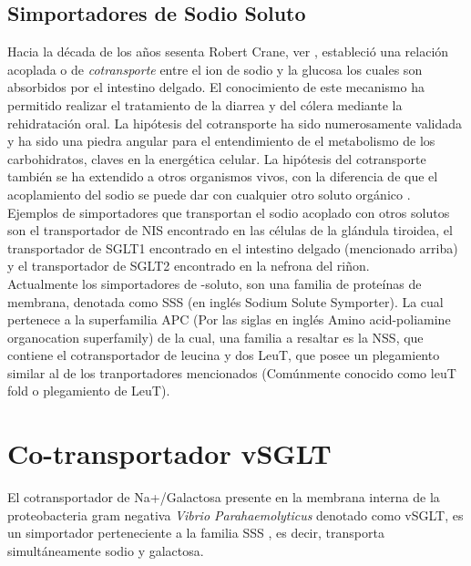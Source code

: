 \subsection{Simportadores de Sodio Soluto}
Hacia la d\'{e}cada de los a\~{n}os sesenta Robert Crane, ver \cite{Hamilton2013}, estableci\'{o} una relaci\'{o}n acoplada o de \textit{cotransporte} entre el ion de sodio y la glucosa los cuales son absorbidos por el intestino delgado. El conocimiento de este mecanismo ha permitido realizar el tratamiento de la diarrea y del c\'{o}lera mediante la rehidrataci\'{o}n oral. La hip\'{o}tesis del cotransporte ha sido numerosamente validada y ha sido una piedra angular para el entendimiento de el metabolismo de los carbohidratos, claves en la energ\'{e}tica celular. La hip\'{o}tesis del cotransporte tambi\'{e}n se ha extendido a otros organismos vivos, con la diferencia de que el acoplamiento del sodio se puede dar con cualquier otro soluto org\'{a}nico \cite{Faham2008}.\\

Ejemplos de simportadores que transportan el sodio acoplado con otros solutos son el transportador de  NIS encontrado en las c\'{e}lulas de la gl\'{a}ndula tiroidea, el transportador de   SGLT1 encontrado en el intestino delgado (mencionado arriba) y el transportador de   SGLT2 encontrado en la nefrona del ri\~{n}on.\\ 

Actualmente los simportadores de -soluto, son una familia de prote\'{i}nas de membrana, denotada como SSS (en ingl\'{e}s Sodium Solute Symporter). La cual pertenece a la superfamilia APC (Por las siglas en ingl\'{e}s Amino acid-poliamine organocation superfamily) de la cual, una familia a resaltar es la NSS, que contiene el cotransportador de leucina y dos  LeuT, que posee un plegamiento similar al de los tranportadores mencionados (Com\'{u}nmente conocido como leuT fold o plegamiento de LeuT).\\
\section{Co-transportador vSGLT}
El cotransportador de Na+/Galactosa presente en la membrana interna de la proteobacteria gram negativa \textit{Vibrio Parahaemolyticus} denotado como vSGLT, es un simportador perteneciente a la familia  SSS \cite{SaierJr.}, es decir, transporta simult\'{a}neamente sodio y galactosa.\\

